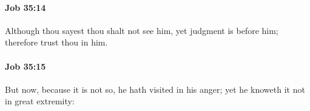 		\paragraph{Job 35:14} %
			\label{JOB-35-14}

			Although thou sayest thou shalt not see him, yet judgment is before him; therefore trust thou in him.


		\paragraph{Job 35:15} %
			\label{JOB-35-15}

			But now, because it is not so, he hath visited in his anger; yet he knoweth it not in great extremity:


